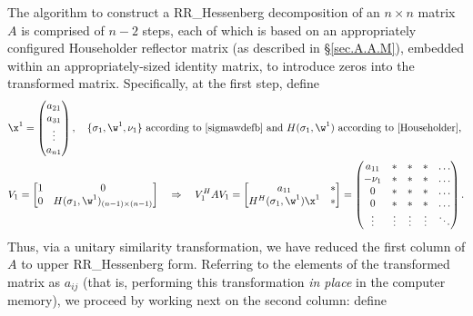 The algorithm to construct a RR_Hessenberg decomposition of an $n\times
n$ matrix $A$ is comprised of $n-2$ steps, each of which is based
on an appropriately configured Householder reflector matrix (as
described in \S \ref{sec.A.A.M}), embedded within an appropriately-sized identity matrix, to introduce zeros into the
transformed matrix.  Specifically, at the first step, define
\begin{align*}
    &\x^{1}=\begin{pmatrix} a_{21} \\ a_{31} \\ \vdots \\ a_{n1} \end{pmatrix}, \quad
    \textrm{$\{\sigma_{1},\w^{1},\nu_{1}\}$ according to \eqref{sigmawdefb} and $H(\sigma_{1},\w^{1})$
    according to \eqref{Householder},}\\
    &V_{1}=\begin{bmatrix} 1 & 0 \\ 0 & H(\sigma_{1},\w^{1})_{(n-1)\times (n-1)} \end{bmatrix}
    \quad \Rightarrow \quad
    V_{1}^{H}A V_{1}=\begin{bmatrix} a_{11} & * \\ H^{H}(\sigma_{1},\w^{1})\x^{1} & * \end{bmatrix} =
    \begin{pmatrix} a_{11}     & * & * & * & \hdots \\
				      -\nu_{1} & * & * & * & \hdots \\
				      0          & * & * & * & \hdots \\
				      0          & * & * & * & \hdots \\
				      \vdots     & \vdots & \vdots & \vdots & \ddots \end{pmatrix}.
\end{align*}
Thus, via a unitary similarity transformation, we have reduced the first
column of $A$ to upper RR_Hessenberg form.  Referring to the elements of the
transformed matrix as $a_{ij}$ (that is, performing this
transformation {\it in place} in the computer memory), we proceed by
working next on the second column: define
\clearpage
